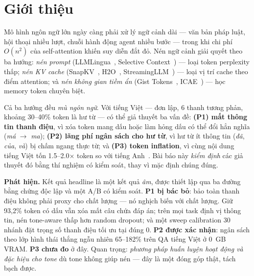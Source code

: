 \documentclass[runningheads]{llncs}
\newcommand{\viet}[1]{\textit{#1}}
\begin{document}
\section{Giới thiệu}

Mô hình ngôn ngữ lớn ngày càng phải xử lý ngữ cảnh dài --- văn bản pháp luật, hội thoại nhiều lượt, chuỗi hành động agent nhiều bước --- trong khi chi phí $O(n^2)$ của self-attention khiến suy diễn đắt đỏ. Nén ngữ cảnh giải quyết theo ba hướng: \emph{nén prompt} (LLMLingua~\cite{jiang2023llmlingua}, Selective Context~\cite{li2023selective}) --- loại token perplexity thấp; \emph{nén KV cache} (SnapKV~\cite{li2024snapkv}, H2O~\cite{zhang2023h2o}, StreamingLLM~\cite{xiao2024streamingllm}) --- loại vị trí cache theo điểm attention; và \emph{nén không gian tiềm ẩn} (Gist Tokens~\cite{mu2023gist}, ICAE~\cite{ge2024icae}) --- học memory token chuyên biệt.

Cả ba hướng đều \emph{mù ngôn ngữ}. Với tiếng Việt --- đơn lập, 6 thanh tương phản, khoảng 30--40\% token là hư từ --- có thể giả thuyết ba vấn đề: \textbf{(P1) mất thông tin thanh điệu}, vì xóa token mang dấu hoặc làm hỏng dấu có thể đổi hẳn nghĩa (\viet{má} $\to$ \viet{ma}); \textbf{(P2) lãng phí ngân sách cho hư từ}, vì hư từ ít thông tin (\viet{đã}, \viet{của}, \viet{và}) bị chấm ngang thực từ; và \textbf{(P3) token inflation}, vì cùng nội dung tiếng Việt tốn 1.5--2.0$\times$ token so với tiếng Anh~\cite{lee2026equity,deng2026language}. Bài báo này \emph{kiểm định} các giả thuyết đó bằng thí nghiệm có kiểm soát, thay vì mặc định chúng đúng.

\textbf{Phát hiện.} Kết quả headline là một kết quả \emph{âm}, được thiết lập qua ba đường bằng chứng độc lập và một A/B có kiểm soát. \textbf{P1 bị bác bỏ}: bảo toàn thanh điệu không phải proxy cho chất lượng --- nó nghịch biến với chất lượng. Giữ 93,2\% token có dấu vẫn xóa mất câu chứa đáp án; trên mọi task định vị thông tin, nén tone-aware thấp hơn random dropout; và một sweep calibration 30 nhánh đặt trọng số thanh điệu tối ưu tại đúng 0. \textbf{P2 được xác nhận}: ngân sách theo lớp hình thái thắng ngẫu nhiên 65--182\% trên QA tiếng Việt ở 0~GB VRAM. \textbf{P3 chưa đo} ở đây. Quan trọng: \emph{phương pháp huấn luyện hoạt động và đặc hiệu cho tone} dù tone không giúp nén --- đây là một đóng góp thật, tách bạch được.
\end{document}
